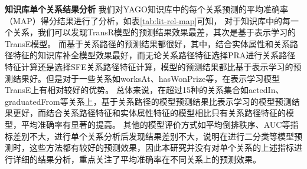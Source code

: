 \textbf{知识库单个关系结果分析}
我们对YAGO知识库中的每个关系预测的平均准确率（MAP）得分结果进行了分析，如表\ref{tab:lit-rel-map}可知，
对于知识库中的每一个关系，我们可以发现TransR模型的预测结果效果最差，其次是基于表示学习的TransE模型。
而基于关系路径的预测结果都很好，其中，结合实体属性和关系路径特征的知识库补全模型效果最好，而无论关系路径特征选择PRA进行关系路径特征计算还是选择SFE关系路径特征计算，模型的预测结果都比基于表示学习的预测结果好。但是对于一些关系如worksAt、hasWonPrize等，在表示学习模型TransE上有相对较好的优势。
总体来说，在超过15种的关系集合如actedIn、graduatedFrom等关系上，基于关系路径的模型预测结果比表示学习的模型预测结果更好，而结合关系路径特征和实体属性特征的模型相比只有关系路径特征的模型，平均准确率有显著的提高。
其他的模型评价方式如平均倒排秩序、AUC等指标差别不大，进行单个关系分析后发现结果差别不大，说明在进行二分类等模型预测时，这些方法都有较好的预测效果，因此本研究并没有对单个关系的上述指标进行详细的结果分析，重点关注了平均准确率在不同关系上的预测效果。
